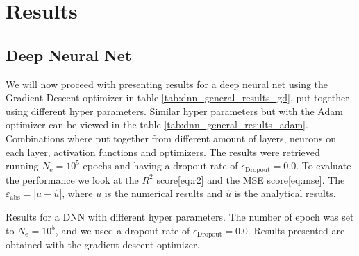 \section{Results}
\subsection{Deep Neural Net}
We will now proceed with presenting results for a deep neural net using the Gradient Descent optimizer in table \ref{tab:dnn_general_results_gd}, put together using different hyper parameters. Similar hyper parameters but with the Adam optimizer can be viewed in the table \ref{tab:dnn_general_results_adam}. Combinations where put together from different amount of layers, neurons on each layer, activation functions and optimizers. The results were retrieved running $N_\mathrm{e}=10^5$ epochs and having a dropout rate of $\epsilon_\mathrm{Dropout}=0.0$. To evaluate the performance we look at the $R^2$ score\eqref{eq:r2} and the MSE score\eqref{eq:mse}. The $\varepsilon_{\mathrm{abs}}=|u - \hat{u}|$, where $u$ is the numerical results and $\hat{u}$ is the analytical results.
\begin{table}[h!tb]
    \centering
    \caption{Results for a DNN with different hyper parameters. The number of epoch was set to $N_\mathrm{e}=10^5$, and we used a dropout rate of $\epsilon_\mathrm{Dropout}=0.0$. Results presented are obtained with the gradient descent optimizer.}
    \label{tab:dnn_general_results_gd}
\end{table}

